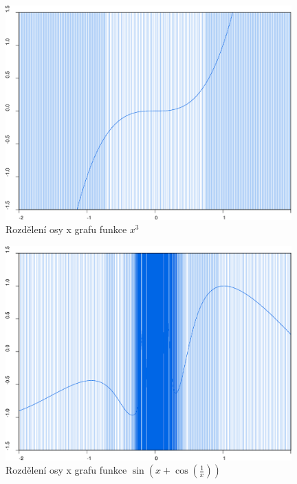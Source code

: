 \documentclass[11pt]{article}
\begin{document}
\begin{figure}[ht!]
\centering
	\includegraphics[width=11cm]{figures/figure2.eps}
	\caption{Rozdělení osy x grafu funkce $x^3$}
\end{figure}
\begin{figure}[ht!]
\centering
	\includegraphics[width=11cm]{figures/figure1.eps}
	\caption{Rozdělení osy x grafu funkce
		$\sin \left(x + \cos \left(\frac{1}{x} \right) \right)$}
\end{figure}
\end{document}
